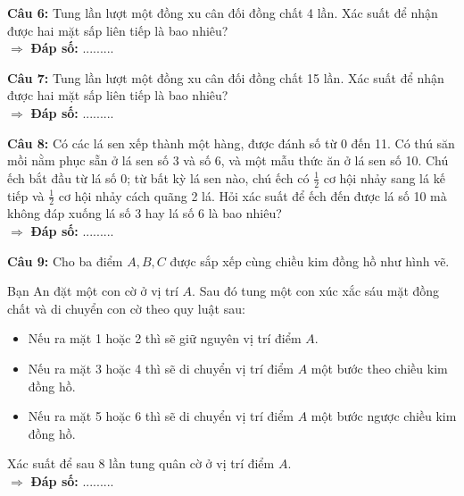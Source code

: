 \documentclass[12pt, a4paper]{article}
\begin{document}
		\noindent \textbf{Câu 6:} Tung lần lượt một đồng xu cân đối đồng chất 4 lần. Xác suất để nhận được hai mặt sấp liên tiếp là bao nhiêu? \\
			\(\Rightarrow\) \textbf{Đáp số:} .........
			
			\noindent \textbf{Câu 7:} Tung lần lượt một đồng xu cân đối đồng chất 15 lần. Xác suất để nhận được hai mặt sấp liên tiếp là bao nhiêu? \\
			\(\Rightarrow\) \textbf{Đáp số:} .........
		
		\noindent \textbf{Câu 8:} Có các lá sen xếp thành một hàng, được đánh số từ 0 đến 11. Có thú săn mồi nằm phục sẵn ở lá sen số 3 và số 6, và một mẫu thức ăn ở lá sen số 10. Chú ếch bắt đầu từ lá số 0; từ bất kỳ lá sen nào, chú ếch có \(\frac{1}{2}\) cơ hội nhảy sang lá kế tiếp và \(\frac{1}{2}\) cơ hội nhảy cách quãng 2 lá. Hỏi xác suất để ếch đến được lá số 10 mà không đáp xuống lá số 3 hay lá số 6 là bao nhiêu? \\
			\(\Rightarrow\) \textbf{Đáp số:} .........
			
			\noindent \textbf{Câu 9:} Cho ba điểm \(A, B, C\) được sắp xếp cùng chiều kim đồng hồ như hình vẽ.
			
			\begin{center}
			\end{center}
			
			Bạn An đặt một con cờ ở vị trí \(A\). Sau đó tung một con xúc xắc sáu mặt đồng chất và di chuyển con cờ theo quy luật sau:
			\begin{itemize}
				\item Nếu ra mặt 1 hoặc 2 thì sẽ giữ nguyên vị trí điểm \(A\).
				\item Nếu ra mặt 3 hoặc 4 thì sẽ di chuyển vị trí điểm \(A\) một bước theo chiều kim đồng hồ.
				\item Nếu ra mặt 5 hoặc 6 thì sẽ di chuyển vị trí điểm \(A\) một bước ngược chiều kim đồng hồ.
			\end{itemize}
			Xác suất để sau 8 lần tung quân cờ ở vị trí điểm \(A\). \\
			\(\Rightarrow\) \textbf{Đáp số:} .........
	\newpage
{}
\end{document}

